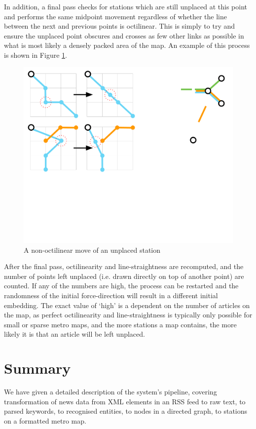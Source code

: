 In addition, a final pass checks for stations which are still unplaced at this point and performs the same midpoint movement regardless of whether the line between the next and previous points is octilinear. This is simply to try and ensure the unplaced point obscures and crosses as few other links as possible in what is most likely a densely packed area of the map. An example of this process is shown in Figure \ref{fig:nonoct}.
\begin{figure}[htbp!]
	\centering
	\includegraphics[width=.8\textwidth]{img/implementation/averagingnonoctilinear.pdf}
	\caption{A non-octilinear move of an unplaced station}
	\label{fig:nonoct}
\end{figure}

After the final pass, octilinearity and line-straightness are recomputed, and the number of points left unplaced (i.e. drawn directly on top of another point) are counted. If any of the numbers are high, the process can be restarted and the randomness of the initial force-direction will result in a different initial embedding. The exact value of `high' is a dependent on the number of articles on the map, as perfect octilinearity and line-straightness is typically only possible for small or sparse metro maps, and the more stations a map contains, the more likely it is that an article will be left unplaced.

\section{Summary}

We have given a detailed description of the system's pipeline, covering transformation of news data from XML elements in an RSS feed to raw text, to parsed keywords, to recognised entities, to nodes in a directed graph, to stations on a formatted metro map.

